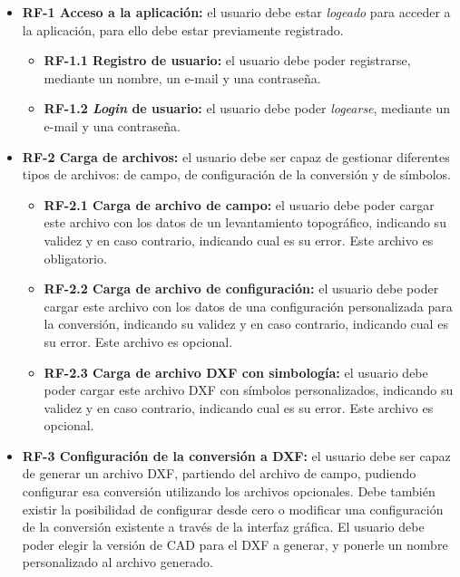 \begin{itemize}
\item \textbf{RF-1 Acceso a la aplicación: }el usuario debe estar \emph{logeado} para acceder a la aplicación, para ello debe estar previamente registrado. 

\begin{itemize}
\item \textbf{RF-1.1 Registro de usuario: }el usuario debe poder 		registrarse, mediante un nombre, un e-mail y una contraseña.
	
\item \textbf{RF-1.2 \emph{Login} de usuario: }el usuario debe poder 	\emph{logearse}, mediante un e-mail y una contraseña.


\end{itemize}

\item \textbf{RF-2 Carga de archivos: }el usuario debe ser capaz de gestionar diferentes tipos de archivos: de campo, de configuración de la conversión y de símbolos.

\begin{itemize}
\item \textbf{RF-2.1 Carga de archivo de campo: }el usuario debe poder cargar este archivo con los datos de un levantamiento topográfico, indicando su validez y en caso contrario, indicando cual es su error. Este archivo es obligatorio.

\item \textbf{RF-2.2 Carga de archivo de configuración: }el usuario debe poder cargar este archivo con los datos de una configuración personalizada para la conversión, indicando su validez y en caso contrario, indicando cual es su error. Este archivo es opcional.

\item \textbf{RF-2.3 Carga de archivo DXF con simbología: }el usuario debe poder cargar este archivo DXF con símbolos personalizados, indicando su validez y en caso contrario, indicando cual es su error. Este archivo es opcional.
	
\end{itemize}

\item \textbf{RF-3 Configuración de la conversión a DXF: }el usuario debe ser capaz de generar un archivo DXF, partiendo del archivo de campo, pudiendo configurar esa conversión utilizando los archivos opcionales. Debe también existir la posibilidad de configurar desde cero o modificar una configuración de la conversión existente a través de la interfaz gráfica. El usuario debe poder elegir la versión de CAD para el DXF a generar, y ponerle un nombre personalizado al archivo generado.


\end{itemize}
